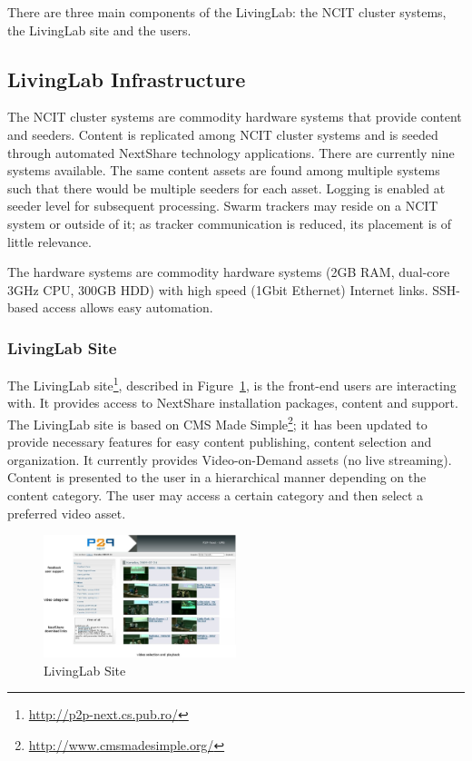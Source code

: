 There are three main components of the LivingLab: the NCIT cluster
systems, the LivingLab site and the users.

\subsection{LivingLab Infrastructure}
\label{subsec:multimedia-dist:evaluation-infrastructure}

The NCIT cluster systems are commodity hardware systems that provide content
and seeders. Content is replicated among NCIT cluster systems and is seeded
through automated NextShare technology applications. There are currently nine
systems available. The same content assets are found among multiple systems
such that there would be multiple seeders for each asset. Logging is enabled
at seeder level for subsequent processing. Swarm trackers may reside on a NCIT
system or outside of it; as tracker communication is reduced, its placement is
of little relevance.

The hardware systems are commodity hardware systems (2GB RAM, dual-core 3GHz
CPU, 300GB HDD) with high speed (1Gbit Ethernet) Internet links. SSH-based
access allows easy automation.

\subsubsection{LivingLab Site}

The LivingLab site\footnote{\url{http://p2p-next.cs.pub.ro/}}, described in
Figure~\ref{fig:multimedia-dist:upb-living-lab-site}, is
the front-end users are interacting with. It provides access to NextShare
installation packages, content and support. The LivingLab site is based on
CMS Made Simple\footnote{\url{http://www.cmsmadesimple.org/}}; it has been updated to
provide necessary features for easy content publishing, content selection and
organization. It currently provides Video-on-Demand assets (no live
streaming). Content is presented to the user in a hierarchical manner
depending on the content category. The user may access a certain
category and then select a preferred video asset.

\begin{figure}
  \centering
  \includegraphics[width=0.5\textwidth]{src/img/multimedia-dist/upb-living-lab-site}
  \caption{LivingLab Site}
  \label{fig:multimedia-dist:upb-living-lab-site}
\end{figure}

